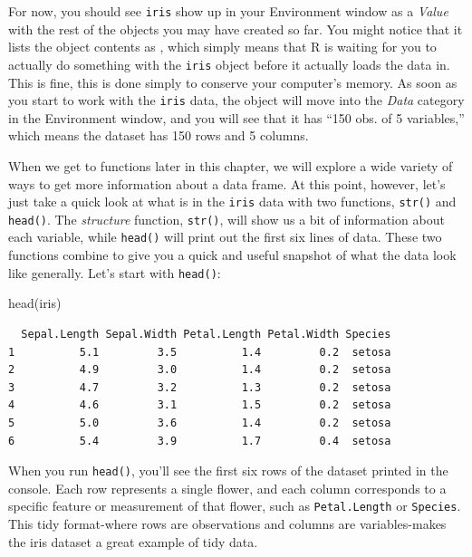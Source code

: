\documentclass[
  letterpaper,
]{book}
\newenvironment{Shaded}{\begin{snugshade}}{\end{snugshade}}
\newcommand{\FunctionTok}[1]{\textcolor[rgb]{0.28,0.35,0.67}{#1}}
\newcommand{\NormalTok}[1]{\textcolor[rgb]{0.00,0.23,0.31}{#1}}
\begin{document}
For now, you should see \texttt{iris} show up in your Environment window
as a \emph{Value} with the rest of the objects you may have created so
far. You might notice that it lists the object contents as , which
simply means that R is waiting for you to actually do something with the
\texttt{iris} object before it actually loads the data in. This is fine,
this is done simply to conserve your computer's memory. As soon as you
start to work with the \texttt{iris} data, the object will move into the
\emph{Data} category in the Environment window, and you will see that it
has ``150 obs. of 5 variables,'' which means the dataset has 150 rows
and 5 columns.

When we get to functions later in this chapter, we will explore a wide
variety of ways to get more information about a data frame. At this
point, however, let's just take a quick look at what is in the
\texttt{iris} data with two functions, \texttt{str()} and
\texttt{head()}. The \emph{structure} function, \texttt{str()}, will
show us a bit of information about each variable, while \texttt{head()}
will print out the first six lines of data. These two functions combine
to give you a quick and useful snapshot of what the data look like
generally. Let's start with \texttt{head()}:

\begin{Shaded}
\begin{Highlighting}[]
\FunctionTok{head}\NormalTok{(iris)}
\end{Highlighting}
\end{Shaded}

\begin{verbatim}
  Sepal.Length Sepal.Width Petal.Length Petal.Width Species
1          5.1         3.5          1.4         0.2  setosa
2          4.9         3.0          1.4         0.2  setosa
3          4.7         3.2          1.3         0.2  setosa
4          4.6         3.1          1.5         0.2  setosa
5          5.0         3.6          1.4         0.2  setosa
6          5.4         3.9          1.7         0.4  setosa
\end{verbatim}

When you run \texttt{head()}, you'll see the first six rows of the
dataset printed in the console. Each row represents a single flower, and
each column corresponds to a specific feature or measurement of that
flower, such as \texttt{Petal.Length} or \texttt{Species}. This tidy
format-where rows are observations and columns are variables-makes the
iris dataset a great example of tidy data.
\end{document}
